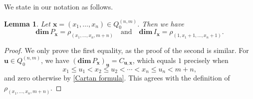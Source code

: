 \documentclass[11pt,a4paper]{amsart}
\newtheorem{lemma}[theorem]{Lemma}
\theoremstyle{definition}
\numberwithin{equation}{section}
\newcommand{\x}{\mathbf{x}}
\newcommand{\0}{\mathbf{0}}
\newcommand{\dimv}{\mathbf{dim}\,}
\begin{document}
	We state \cite[Theorem~3.6(1)(2)]{OT} in our notation as follows.
	
	\begin{lemma} \label{projective,injective,rho}
		Let $\x=(x_1,\ldots,x_n)\in Q_0^{(n,m)}$. Then we have
		\[
		\dimv P_{\x}=\rho_{(x_1,\ldots,x_n,m+n)}
		\quad \text{and}\quad
		\dimv I_{\x}=\rho_{(1,x_1+1,\ldots,x_n+1)}.
		\]
	\end{lemma}
	
	\begin{proof}
		We only prove the first equality, as the proof of the second is similar.
		For $\mathbf u\in Q_0^{(n,m)}$, we have 
		$(\dimv P_{\x})_{\mathbf u}=C_{\mathbf u,\x}$, which equals $1$
		precisely when
		\[
		x_1\le u_1<x_2\le u_2<\cdots<x_n\le u_n<m+n,
		\]
		and zero otherwise by \eqref{Cartan formula}. This agrees with the definition of 
		$\rho_{(x_1,\ldots,x_n,m+n)}$.
	\end{proof}
	
\end{document}
